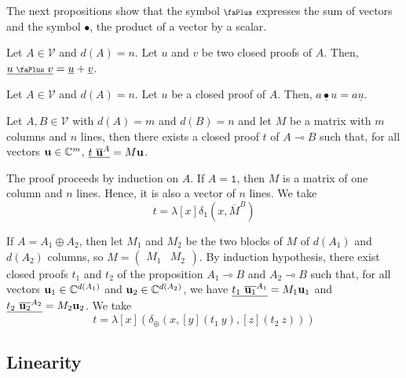 \documentclass[screen, sigconf,authorversion,nonacm]{acmart}
\theoremstyle{acmdefinition}
\numberwithin{equation}{section}
\newcommand\abstr[1]{[#1]}
\newcommand\plus{\mathrel{\text{\normalfont\scalebox{0.7}{\faPlus}}}}
\newcommand\one{\ensuremath{\mathtt 1}}
\newcommand\elimone{\delta_{\one}}
\newcommand\elimplus{\delta_{\oplus}}
\begin{document}
The next propositions show that the symbol $\plus$ expresses the sum
of vectors and the symbol $\bullet$, the product of a vector by a
scalar.

\begin{proposition}
\label{parallelsum}
Let $A \in \mathcal{V}$ and $d(A) = n$.  Let $u$ and $v$ be two closed
proofs of $A$.  Then, $\underline{u \plus v} = \underline{u} +
\underline{v}$.
\end{proposition}

\begin{proposition}
\label{parallelprod}
Let $A \in \mathcal{V}$ and $d(A) = n$.  Let $u$ be a closed proof of
$A$.  Then, $\underline{a \bullet u} = a \underline{u}$.
\end{proposition}

\begin{theorem}[Matrices]
\label{matrices}
Let $A, B \in \mathcal{V}$ with $d(A) = m$ and $d(B) = n$ and let $M$
be a matrix with $m$ columns and $n$ lines, then there exists a closed
proof $t$ of $A \multimap B$ such that, for all vectors ${\bf u} \in
{\mathbb C}^m$, $\underline{t~\overline{\bf u}^A} = M {\bf u}$.
\end{theorem}

The proof proceeds by induction on $A$.  If $A = \one$, then $M$ is a
matrix of one column and $n$ lines. Hence, it is also a vector of $n$
lines.  We take
$$t = \lambda \abstr{x} \elimone(x,\overline{M}^B)$$

If $A = A_1 \oplus A_2$, then let $M_1$ and $M_2$ be the two blocks of
$M$ of $d(A_1)$ and $d(A_2)$ columns, so $M =
\left(\begin{smallmatrix} M_1 & M_2\end{smallmatrix}\right)$.  By
  induction hypothesis, there exist closed proofs $t_1$ and $t_2$ of
  the proposition $A_1 \multimap B$ and $A_2 \multimap B$ such that,
  for all vectors ${\bf u}_1 \in {\mathbb C}^{d(A_1)}$ and ${\bf u}_2
  \in {\mathbb C}^{d(A_2)}$, we have $\underline{t_1~\overline{{\bf
        u}_1}^{A_1}} = M_1 {\bf u}_1$ and
  $\underline{t_2~\overline{{\bf u}_2}^{A_2}} = M_2 {\bf u}_2$.  We
  take
    $$t = \lambda \abstr{x} (\elimplus(x, \abstr{y} (t_1~y),
    \abstr{z} (t_2~z)))$$

\subsection{Linearity}
\label{seclinearity}
\end{document}
